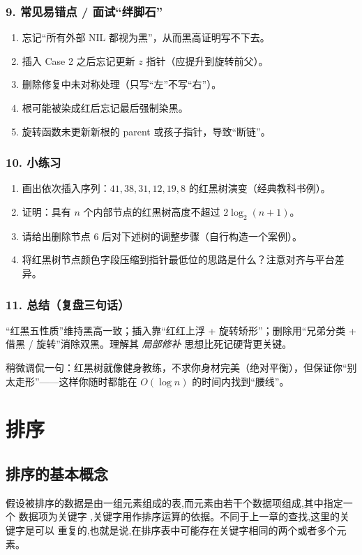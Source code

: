 \documentclass[lang=cn,newtx,10pt,scheme=chinese]{../elegantbook}
\begin{document}
\subsection{9. 常见易错点 / 面试“绊脚石”}
\begin{enumerate}
  \item 忘记“所有外部 NIL 都视为黑”，从而黑高证明写不下去。
  \item 插入 Case 2 之后忘记更新 \(z\) 指针（应提升到旋转前父）。
  \item 删除修复中未对称处理（只写“左”不写“右”）。
  \item 根可能被染成红后忘记最后强制染黑。
  \item 旋转函数未更新新根的 parent 或孩子指针，导致“断链”。
\end{enumerate}

\subsection{10. 小练习}
\begin{enumerate}
  \item 画出依次插入序列：\(41, 38, 31, 12, 19, 8\) 的红黑树演变（经典教科书例）。
  \item 证明：具有 \(n\) 个内部节点的红黑树高度不超过 \(2\log_2(n+1)\)。
  \item 请给出删除节点 6 后对下述树的调整步骤（自行构造一个案例）。
  \item 将红黑树节点颜色字段压缩到指针最低位的思路是什么？注意对齐与平台差异。
\end{enumerate}

\subsection{11. 总结（复盘三句话）}
“红黑五性质”维持黑高一致；插入靠“红红上浮 + 旋转矫形”；删除用“兄弟分类 + 借黑 / 旋转”消除双黑。理解其 \textit{局部修补} 思想比死记硬背更关键。

稍微调侃一句：红黑树就像健身教练，不求你身材完美（绝对平衡），但保证你“别太走形”——这样你随时都能在 \(O(\log n)\) 的时间内找到“腰线”。



\chapter{排序}

\section{排序的基本概念}
假设被排序的数据是由一组元素组成的表,而元素由若干个数据项组成,其中指定一个
数据项为关键字 ,关键字用作排序运算的依据。不同于上一章的查找,这里的关键字是可以
重复的,也就是说,在排序表中可能存在关键字相同的两个或者多个元素。
\end{document}
